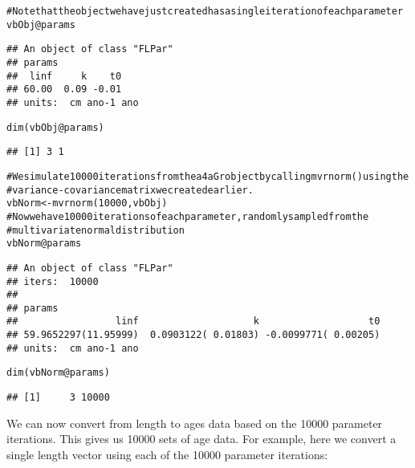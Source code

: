 \documentclass[a4paper,english,10pt]{article}\usepackage[]{graphicx}\usepackage[]{color}
\makeatletter
\newcommand{\hlnum}[1]{\textcolor[rgb]{0.2,0.2,0.2}{#1}}%
\newcommand{\hlcom}[1]{\textcolor[rgb]{0.2,0.267,0.4}{#1}}%
\newcommand{\hlopt}[1]{\textcolor[rgb]{0.2,0.2,0.2}{#1}}%
\newcommand{\hlstd}[1]{\textcolor[rgb]{0,0,0}{#1}}%
\newcommand{\hlkwb}[1]{\textcolor[rgb]{0.361,0.506,0.596}{#1}}%
\newcommand{\hlkwc}[1]{\textcolor[rgb]{0.361,0.506,0.596}{#1}}%
\newcommand{\hlkwd}[1]{\textcolor[rgb]{0.361,0.506,0.596}{#1}}%
\newenvironment{kframe}{%
 \def\at@end@of@kframe{}%
 \ifinner\ifhmode%
  \def\at@end@of@kframe{\end{minipage}}%
  \begin{minipage}{\columnwidth}%
 \fi\fi%
 \def\FrameCommand##1{\hskip\@totalleftmargin \hskip-\fboxsep
 \colorbox{shadecolor}{##1}\hskip-\fboxsep
     \hskip-\linewidth \hskip-\@totalleftmargin \hskip\columnwidth}%
 \MakeFramed {\advance\hsize-\width
   \@totalleftmargin\z@ \linewidth\hsize
   \@setminipage}}%
 {\par\unskip\endMakeFramed%
 \at@end@of@kframe}
\newenvironment{knitrout}{}{} %
\makeatother
\begin{document}
\begin{knitrout}
\color{fgcolor}\begin{kframe}
\begin{alltt}
\hlcom{# Note that the object we have just created has a single iteration of each parameter}
\hlstd{vbObj}\hlopt{@}\hlkwc{params}
\end{alltt}
\begin{verbatim}
## An object of class "FLPar"
## params
##  linf     k    t0 
## 60.00  0.09 -0.01 
## units:  cm ano-1 ano
\end{verbatim}
\begin{alltt}
\hlkwd{dim}\hlstd{(vbObj}\hlopt{@}\hlkwc{params}\hlstd{)}
\end{alltt}
\begin{verbatim}
## [1] 3 1
\end{verbatim}
\begin{alltt}
\hlcom{# We simulate 10000 iterations from the a4aGr object by calling mvrnorm() using the }
\hlcom{# variance-covariance matrix we created earlier.}
\hlstd{vbNorm} \hlkwb{<-} \hlkwd{mvrnorm}\hlstd{(}\hlnum{10000}\hlstd{,vbObj)}
\hlcom{# Now we have 10000 iterations of each parameter, randomly sampled from the }
\hlcom{# multivariate normal distribution}
\hlstd{vbNorm}\hlopt{@}\hlkwc{params}
\end{alltt}
\begin{verbatim}
## An object of class "FLPar"
## iters:  10000 
## 
## params
##                 linf                    k                   t0 
## 59.9652297(11.95999)  0.0903122( 0.01803) -0.0099771( 0.00205) 
## units:  cm ano-1 ano
\end{verbatim}
\begin{alltt}
\hlkwd{dim}\hlstd{(vbNorm}\hlopt{@}\hlkwc{params}\hlstd{)}
\end{alltt}
\begin{verbatim}
## [1]     3 10000
\end{verbatim}
\end{kframe}
\end{knitrout}

We can now convert from length to ages data based on the 10000 parameter iterations. This gives us 10000 sets of age data. For example, here we convert a single length vector using each of the 10000 parameter iterations: 
\end{document}
